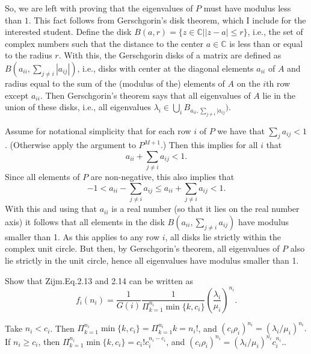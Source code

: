 \begin{exercise}
\begin{solution}
So, we are left with proving that the eigenvalues of $P$ must have
modulus less than $1$. This fact follows from Gerschgorin's disk
theorem, which I include for the interested student. Define the disk
$B(a,r)=\{z\in \mathbb{C} | |z-a|\leq r\}$, i.e., the set of complex numbers
such that the distance to the center $a\in \mathbb{C} $ is less than or equal
to the radius $r$. With this, the Gerschgorin disks of a matrix are
defined as $B(a_{ii}, \sum_{j\neq i} |a_{i j}|)$, i.e., disks with
center at the diagonal elements $a_{ii}$ of $A$ and radius equal
to the sum of the (modulus of the) elements of $A$ on the $i$th row
except $a_{ii}$. Then Gerschgorin's theorem says that all eigenvalues
of $A$ lie in the union of these disks, i.e., all eigenvalues
$\lambda_i \in \bigcup_i B_{a_{ii}, \sum_{j\neq i}|a_{i j}})$.

Assume for notational simplicity that for each row $i$ of $P$ we have
that $\sum_{j} a_{i j}<1$. (Otherwise apply the argument to $P^{M+1}$.)
Then this implies for all $i$ that
\begin{equation*}
  a_{ii} + \sum_{j\neq i} a_{i j} < 1. 
\end{equation*}
Since all elements of $P$ are non-negative, this also implies that
\begin{equation*}
-1 <   a_{ii} - \sum_{j\neq i} a_{i j} \leq  a_{ii} + \sum_{j\neq i} a_{i j} < 1. 
\end{equation*}
With this and using that $a_{ii}$ is a real number (so that it lies on
the real number axis) it follows that all elements in the disk
$B(a_{ii}, \sum_{j\neq i} a_{i j})$ have modulus smaller than 1.  As
this applies to any row $i$, all disks lie strictly within the complex
unit circle. But then, by Gerschgorin's theorem, all eigenvalues of
$P$ also lie strictly in the unit circle, hence all eigenvalues have
modulus smaller than 1.
\end{solution}
\end{exercise}

\begin{exercise}\label{ex:23}
  Show that Zijm.Eq.2.13 and 2.14 can be written as
  \begin{equation*}
    f_i(n_i) = \frac{1}{G(i)}\frac{1}{\Pi_{k=1}^{n_i} \min\{k, c_i\}}\left( \frac{\lambda_i}{\mu_i}\right)^{n_i}.
  \end{equation*}
  \begin{solution}
    Take $n_i<c_i$. Then
    $\Pi_{k=1}^{n_i} \min\{k, c_i\} = \Pi_{k=1}^{n_i} k = n_i!$, and
    $(c_i\rho_i)^{n_i} = (\lambda_i/\mu_i)^{n_i}.$ If $n_i\geq c_i$,
    then $\Pi_{k=1}^{n_i} \min\{k, c_i\} = c_i! c_i^{n_i-c_i}$, and
    $(c_i\rho_i)^{n_i} = (\lambda_i/\mu_i)^{n_i} c_i^{n_i}.$.
  \end{solution}
\end{exercise}



